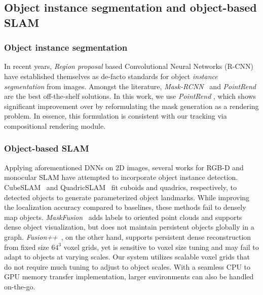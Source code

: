 \subsection{Object instance segmentation and object-based SLAM}
\subsubsection{Object instance segmentation}
In recent years, \textit{Region proposal} based Convolutional Neural Networks (R-CNN) \cite{renFasterRCNNRealTime2016} have established themselves as de-facto standards for object \textit{instance segmentation} from images. Amongst the literature, \textit{Mask-RCNN}~\cite{heMaskRCNN2018} and \textit{PointRend}~\cite{kirillovPointRendImageSegmentation2020} are the best off-the-shelf solutions.
In this work, we use \textit{PointRend} \cite{kirillovPointRendImageSegmentation2020}, which shows significant improvement over \cite{heMaskRCNN2018} by reformulating the mask generation as a rendering problem. In essence, this formulation is consistent with our tracking via compositional rendering module.

\subsubsection{Object-based SLAM}
Applying aforementioned DNNs on 2D images, several works for RGB-D and monocular SLAM have attempted to incorporate object instance detection. CubeSLAM~\cite{yangMonocularObjectPlane2019} and QuadricSLAM~\cite{nicholsonQuadricSLAMDualQuadrics2019} fit cuboids and quadrics, respectively, to detected objects to generate parameterized object landmarks. While improving the localization accuracy compared to baselines, these methods fail to densely map objects. \textit{MaskFusion}~\cite{runzMaskFusionRealTimeRecognition2018} adds labels to oriented point clouds and supports dense object visualization, but does not maintain persistent objects globally in a graph. \textit{Fusion++}~\cite{mccormacFusionVolumetricObjectLevel2018}, on the other hand, supports persistent dense reconstruction from fixed size $64^3$ voxel grids, yet is sensitive to voxel size tuning and may fail to adapt to objects at varying scales.
Our system utilizes scalable voxel grids that do not require much tuning to adjust to object scales. With a seamless CPU to GPU memory transfer implementation, larger environments can also be handled on-the-go.



